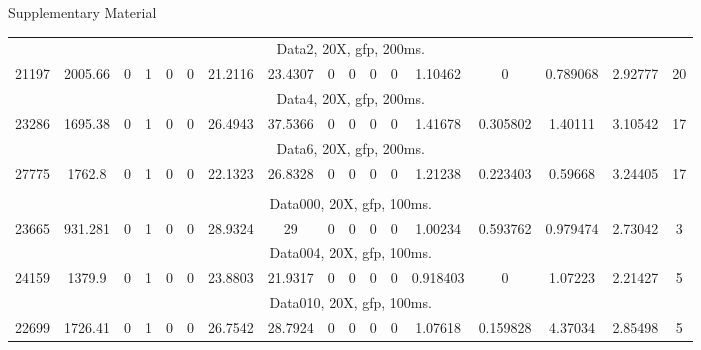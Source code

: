 \begin{wcfChaps}{Supplementary Material}
\begin{sidewaystable}
{\begin{tabular}{|c|c|c|c|c|c|c|c|c|c|c|c|c|c|c|c|c|}
\rowcolor{gray} \multicolumn{17}{|>{\columncolor[rgb]{0,1,0}}c|}{Wavy Tube}\\\hline
\multicolumn{17}{|c|}{Data2, 20X, gfp, 200ms.}\\\hline 21197 & 2005.66 & 0 & 1 & 0 & 0 & 21.2116 & 23.4307 & 0 & 0 & 0 & 0 & 1.10462 & 0 & 0.789068 & 2.92777 & 20 \\\hline
\multicolumn{17}{|c|}{Data4, 20X, gfp, 200ms.}\\\hline 23286 & 1695.38 & 0 & 1 & 0 & 0 & 26.4943 & 37.5366 & 0 & 0 & 0 & 0 & 1.41678 & 0.305802 & 1.40111 & 3.10542 & 17 \\\hline
\multicolumn{17}{|c|}{Data6, 20X, gfp, 200ms.}\\\hline 27775 & 1762.8 & 0 & 1 & 0 & 0 & 22.1323 & 26.8328 & 0 & 0 & 0 & 0 & 1.21238 & 0.223403 & 0.59668 & 3.24405 & 17 \\\hline

\rowcolor{green} \multicolumn{17}{|>{\columncolor[rgb]{0,1,0}}c|}{Wildtype}\\\hline
\multicolumn{17}{|c|}{Data000, 20X, gfp, 100ms.}\\\hline 23665 & 931.281 & 0 & 1 & 0 & 0 & 28.9324 & 29 & 0 & 0 & 0 & 0 & 1.00234 & 0.593762 & 0.979474 & 2.73042 & 3 \\\hline
\multicolumn{17}{|c|}{Data004, 20X, gfp, 100ms.}\\\hline 24159 & 1379.9 & 0 & 1 & 0 & 0 & 23.8803 & 21.9317 & 0 & 0 & 0 & 0 & 0.918403 & 0 & 1.07223 & 2.21427 & 5 \\\hline
\multicolumn{17}{|c|}{Data010, 20X, gfp, 100ms.}\\\hline 22699 & 1726.41 & 0 & 1 & 0 & 0 & 26.7542 & 28.7924 & 0 & 0 & 0 & 0 & 1.07618 & 0.159828 & 4.37034 & 2.85498 & 5 \\ \hline
\end{tabular}
}
\end{sidewaystable}



\end{wcfChaps}
